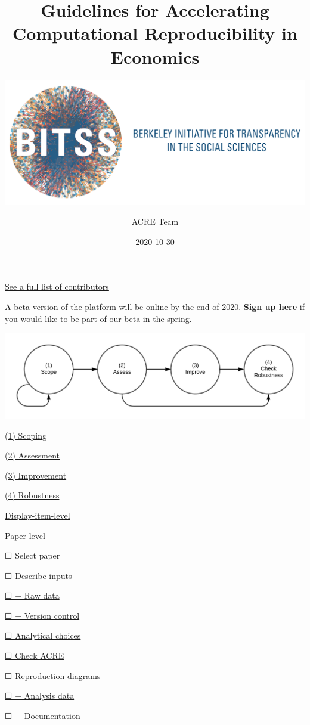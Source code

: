\documentclass[]{book}
\title{Guidelines for Accelerating Computational Reproducibility in Economics}
\subtitle{\href{https://www.bitss.org/}{\includegraphics{BITSS_logo_horizontal.png}}\\}
\author{ACRE Team}
\date{2020-10-30}
\begin{document}
\maketitle

{
\setcounter{tocdepth}{1}
\tableofcontents
}
\hypertarget{section}{%
\chapter*{}\label{section}}

\protect\hyperlink{contributions}{See a full list of contributors}

A beta version of the platform will be online by the end of 2020.
\href{https://forms.gle/yZivWcwijCzEhrBU6}{\textbf{Sign up here}} if you would like to be part of our beta in the spring.

\includegraphics[width=1\linewidth]{stages}

\protect\hyperlink{scoping}{(1) Scoping}

\protect\hyperlink{assessment}{(2) Assessment}

\protect\hyperlink{improvements}{(3) Improvement}

\protect\hyperlink{robust}{(4) Robustness}

\protect\hyperlink{di-imp}{Display-item-level}

\protect\hyperlink{paper-level}{Paper-level}

☐ Select paper

\protect\hyperlink{describe-inputs}{☐ Describe inputs}

\protect\hyperlink{rd}{☐ + Raw data}

\protect\hyperlink{paper-level}{☐ + Version control}

\protect\hyperlink{id-analy}{☐ Analytical choices}

\protect\hyperlink{check-acre}{☐ Check ACRE}

\protect\hyperlink{diagram}{☐ Reproduction diagrams}

\protect\hyperlink{ad}{☐ + Analysis data}

\protect\hyperlink{paper-level}{☐ + Documentation}
\end{document}
